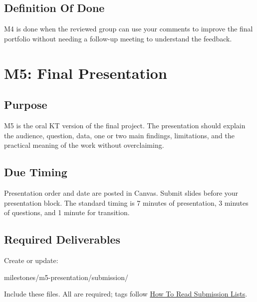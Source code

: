 \documentclass[
  letterpaper,
  DIV=11,
  numbers=noendperiod,
  oneside]{scrreprt}
\newenvironment{Shaded}{\begin{snugshade}}{\end{snugshade}}
\newcommand{\NormalTok}[1]{\textcolor[rgb]{0.00,0.23,0.31}{#1}}
\begin{document}
\section{Definition Of Done}\label{definition-of-done-25}

M4 is done when the reviewed group can use your comments to improve the
final portfolio without needing a follow-up meeting to understand the
feedback.

\chapter{M5: Final Presentation}\label{m5-final-presentation}

\section{Purpose}\label{purpose-18}

M5 is the oral KT version of the final project. The presentation should
explain the audience, question, data, one or two main findings,
limitations, and the practical meaning of the work without overclaiming.

\section{Due Timing}\label{due-timing-5}

Presentation order and date are posted in Canvas. Submit slides before
your presentation block. The standard timing is 7 minutes of
presentation, 3 minutes of questions, and 1 minute for transition.

\section{Required Deliverables}\label{required-deliverables-5}

Create or update:

\begin{Shaded}
\begin{Highlighting}[numbers=left,,]
\NormalTok{milestones/m5{-}presentation/submission/}
\end{Highlighting}
\end{Shaded}

Include these files. All are required; tags follow
\hyperref[how-to-read-submission-lists]{How To Read Submission Lists}.
\end{document}
